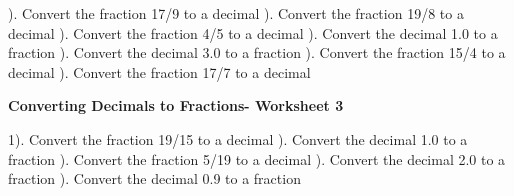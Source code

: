 \documentclass{article}%
\begin{document}
). Convert the fraction 17/9 to a decimal%
\newline%
\newline%
). Convert the fraction 19/8 to a decimal%
\newline%
\newline%
). Convert the fraction 4/5 to a decimal%
\newline%
\newline%
). Convert the decimal 1.0 to a fraction%
\newline%
\newline%
). Convert the decimal 3.0 to a fraction%
\newline%
\newline%
). Convert the fraction 15/4 to a decimal%
\newline%
\newline%
). Convert the fraction 17/7 to a decimal%
\newline%
\newline%
\newline%
\pagebreak%
\large%
\begin{center}%
\textbf{Converting Decimals to Fractions- Worksheet 3}%
\newline%
\end{center} \normalsize%
1). Convert the fraction 19/15 to a decimal%
\newline%
\newline%
). Convert the decimal 1.0 to a fraction%
\newline%
\newline%
). Convert the fraction 5/19 to a decimal%
\newline%
\newline%
). Convert the decimal 2.0 to a fraction%
\newline%
\newline%
). Convert the decimal 0.9 to a fraction%
\newline%
\newline%
\newline%
\end{document}
